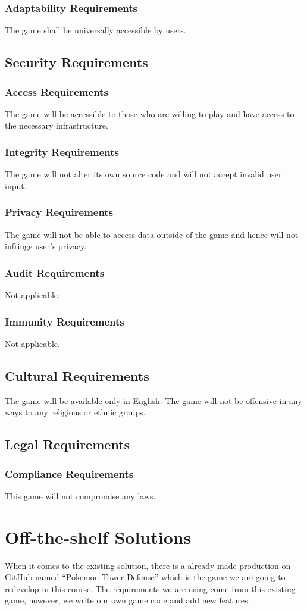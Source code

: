 \documentclass{article}
\begin{document}
\subsubsection{Adaptability Requirements}
The game shall be universally accessible by users.

\subsection{Security Requirements}
\subsubsection{Access Requirements}
The game will be accessible to those who are willing to play and have access to the necessary infrastructure. 
\subsubsection{Integrity Requirements}
The game will not alter its own source code and will not accept invalid user input.
\subsubsection{Privacy Requirements}
The game will not be able to access data outside of the game and hence will not infringe user’s privacy.
\subsubsection{Audit Requirements}
Not applicable.
\subsubsection{Immunity Requirements}
Not applicable.

\subsection{Cultural Requirements}
The game will be available only in English. The game will not be offensive in any ways to any religious or ethnic groups.

\subsection{Legal Requirements}
\subsubsection{Compliance Requirements}
This game will not compromise any laws.
\newpage
\section{Off-the-shelf Solutions}
When it comes to the existing solution, there is a already made production on GitHub named “Pokemon Tower Defense” which is the game we are going to redevelop in this course. The requirements we are using come from this existing game, however, we write our own game code and add new features.

 
\end{document}
